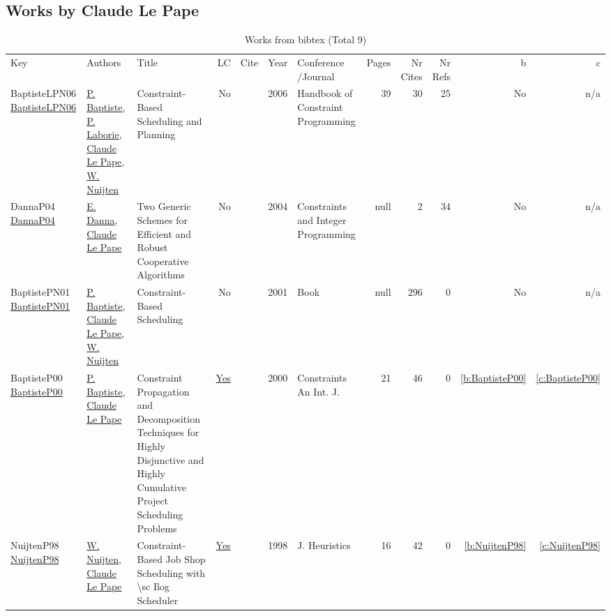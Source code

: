 \subsection{Works by Claude Le Pape}
\label{sec:a165}
{\scriptsize
\begin{longtable}{>{\raggedright\arraybackslash}p{3cm}>{\raggedright\arraybackslash}p{6cm}>{\raggedright\arraybackslash}p{6.5cm}rrrp{2.5cm}rrrrr}
\rowcolor{white}\caption{Works from bibtex (Total 9)}\\ \toprule
\rowcolor{white}Key & Authors & Title & LC & Cite & Year & \shortstack{Conference\\/Journal} & Pages & \shortstack{Nr\\Cites} & \shortstack{Nr\\Refs} & b & c \\ \midrule\endhead
\bottomrule
\endfoot
BaptisteLPN06 \href{https://doi.org/10.1016/S1574-6526(06)80026-X}{BaptisteLPN06} & \hyperref[auth:a164]{P. Baptiste}, \hyperref[auth:a118]{P. Laborie}, \hyperref[auth:a165]{Claude Le Pape}, \hyperref[auth:a666]{W. Nuijten} & Constraint-Based Scheduling and Planning & No & \cite{BaptisteLPN06} & 2006 & Handbook of Constraint Programming & 39 & 30 & 25 & No & n/a\\
DannaP04 \href{http://dx.doi.org/10.1007/978-1-4419-8917-8_2}{DannaP04} & \hyperref[auth:a290]{E. Danna}, \hyperref[auth:a165]{Claude Le Pape} & Two Generic Schemes for Efficient and Robust Cooperative Algorithms & No & \cite{DannaP04} & 2004 & Constraints and Integer Programming & null & 2 & 34 & No & n/a\\
BaptistePN01 \href{http://dx.doi.org/10.1007/978-1-4615-1479-4}{BaptistePN01} & \hyperref[auth:a164]{P. Baptiste}, \hyperref[auth:a165]{Claude Le Pape}, \hyperref[auth:a666]{W. Nuijten} & Constraint-Based Scheduling & No & \cite{BaptistePN01} & 2001 & Book & null & 296 & 0 & No & n/a\\
BaptisteP00 \href{https://doi.org/10.1023/A:1009822502231}{BaptisteP00} & \hyperref[auth:a164]{P. Baptiste}, \hyperref[auth:a165]{Claude Le Pape} & Constraint Propagation and Decomposition Techniques for Highly Disjunctive and Highly Cumulative Project Scheduling Problems & \href{works/BaptisteP00.pdf}{Yes} & \cite{BaptisteP00} & 2000 & Constraints An Int. J. & 21 & 46 & 0 & \ref{b:BaptisteP00} & \ref{c:BaptisteP00}\\
NuijtenP98 \href{https://doi.org/10.1023/A:1009687210594}{NuijtenP98} & \hyperref[auth:a666]{W. Nuijten}, \hyperref[auth:a165]{Claude Le Pape} & Constraint-Based Job Shop Scheduling with {\textbackslash}sc Ilog Scheduler & \href{works/NuijtenP98.pdf}{Yes} & \cite{NuijtenP98} & 1998 & J. Heuristics & 16 & 42 & 0 & \ref{b:NuijtenP98} & \ref{c:NuijtenP98}\\

\end{longtable}}

